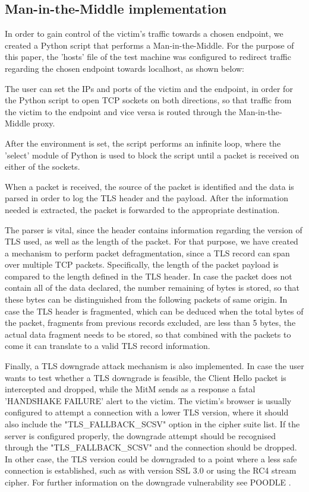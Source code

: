\subsection{Man-in-the-Middle implementation}

In order to gain control of the victim's traffic towards a chosen endpoint, we
created a Python script that performs a Man-in-the-Middle. For the purpose of
this paper, the 'hosts' file of the test machine was configured to redirect
traffic regarding the chosen endpoint towards localhost, as shown below:


The user can set the IPs and ports of the victim and the endpoint, in order for
the Python script to open TCP sockets on both directions, so that traffic from
the victim to the endpoint and vice versa is routed through the
Man-in-the-Middle proxy.

After the environment is set, the script performs an infinite loop, where the
'select' module of Python is used to block the script until a packet is received
on either of the sockets.

When a packet is received, the source of the packet is identified and the data
is parsed in order to log the TLS header and the payload. After the information
needed is extracted, the packet is forwarded to the appropriate destination.

The parser is vital, since the header contains information regarding the version
of TLS used, as well as the length of the packet. For that purpose, we have
created a mechanism to perform packet defragmentation, since a TLS record can
span over multiple TCP packets. Specifically, the length of the packet payload
is compared to the length defined in the TLS header. In case the packet does not
contain all of the data declared, the number remaining of bytes is stored, so
that these bytes can be distinguished from the following packets of same origin.
In case the TLS header is fragmented, which can be deduced when the total bytes
of the packet, fragments from previous records excluded, are less than 5 bytes,
the actual data fragment needs to be stored, so that combined with the packets
to come it can translate to a valid TLS record information.

Finally, a TLS downgrade attack mechanism is also implemented. In case the user
wants to test whether a TLS downgrade is feasible, the Client Hello packet is
intercepted and dropped, while the MitM sends as a response a fatal 'HANDSHAKE
FAILURE' alert to the victim. The victim's browser is usually configured to
attempt a connection with a lower TLS version, where it should also include the
"TLS\_FALLBACK\_SCSV" option in the cipher suite list. If the server is
configured properly, the downgrade attempt should be recognised through the
"TLS\_FALLBACK\_SCSV" and the connection should be dropped. In other case, the
TLS version could be downgraded to a point where a less safe connection is
established, such as with version SSL 3.0 or using the RC4 stream cipher. For
further information on the downgrade vulnerability see POODLE \cite{poodle}.

